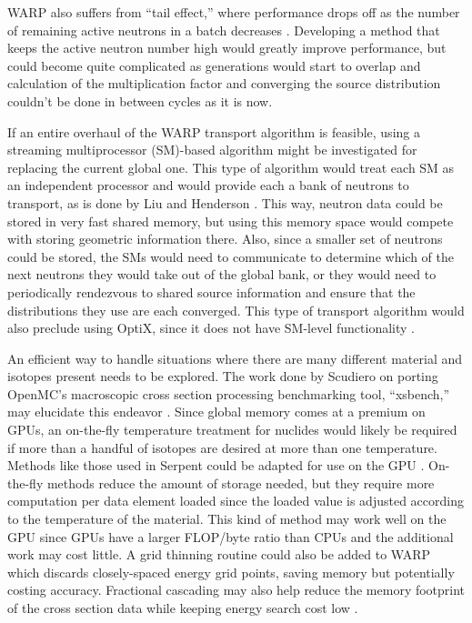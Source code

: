 \documentclass[preprint,12pt]{elsarticle}
\begin{document}
WARP also suffers from ``tail effect,'' where performance drops off as the number of remaining active neutrons in a batch decreases \cite{algorithms}.  Developing a method that keeps the active neutron number high would greatly improve performance, but could become quite complicated as generations would start to overlap and calculation of the multiplication factor and converging the source distribution couldn't be done in between cycles as it is now.  

If an entire overhaul of the WARP transport algorithm is feasible, using a streaming multiprocessor (SM)-based algorithm might be investigated for replacing the current global one.  This type of algorithm would treat each SM as an independent processor and would provide each a bank of neutrons to transport, as is done by Liu and Henderson \cite{tianyu,henderson}.   This way, neutron data could be stored in very fast shared memory, but using this memory space would compete with storing geometric information there.  Also, since a smaller set of neutrons could be stored, the SMs would need to communicate to determine which of the next neutrons they would take out of the global bank, or they would need to periodically rendezvous to shared source information and ensure that the distributions they use are each converged.  This type of transport algorithm would also preclude using OptiX, since it does not have SM-level functionality \cite{optix}.

An efficient way to handle situations where there are many different material and isotopes present needs to be explored.  The work done by Scudiero on porting OpenMC's macroscopic cross section processing benchmarking tool, ``xsbench,'' may elucidate this endeavor \cite{openmc,scudiero}.   Since global memory comes at a premium on GPUs, an on-the-fly temperature treatment for nuclides would likely be required if more than a handful of isotopes are desired at more than one temperature.  Methods like those used in Serpent could be adapted for use on the GPU \cite{serpent}.  On-the-fly methods reduce the amount of storage needed, but they require more computation per data element loaded since the loaded value is adjusted according to the temperature of the material.  This kind of method may work well on the GPU since GPUs have a larger FLOP/byte ratio than CPUs and the additional work may cost little.  A grid thinning routine could also be added to WARP which discards closely-spaced energy grid points, saving memory but potentially costing accuracy.  Fractional cascading may also help reduce the memory footprint of the cross section data while keeping energy search cost low \cite{Lund2015}. 
\end{document}
